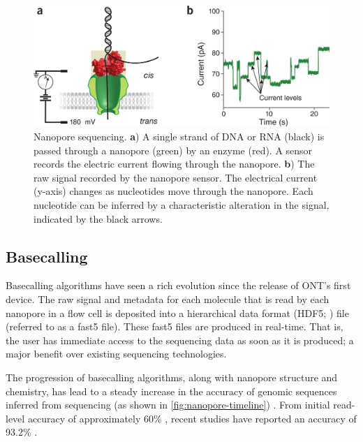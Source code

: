 \begin{figure}
\centering
\includegraphics[width=0.9\columnwidth]{Chapter0/Figs/nanopore.png}
\caption{Nanopore sequencing. \textbf{a}) A single strand of DNA or RNA (black) is passed through a nanopore (green) by an enzyme (red). A sensor records the electric current flowing through the nanopore. \textbf{b}) The raw signal recorded by the nanopore sensor. The electrical current (y-axis) changes as nucleotides move through the nanopore. Each nucleotide can be inferred by a characteristic alteration in the signal, indicated by the black arrows.}
\label{fig:nanopore}
\end{figure}

\subsection{Basecalling}

Basecalling algorithms have seen a rich evolution since the release of ONT's first device. The raw signal and metadata for each molecule that is read by each nanopore in a flow cell is deposited into a hierarchical data format (HDF5; \cite{hdf5}) file (referred to as a fast5 file). These fast5 files are produced in real-time. That is, the user has immediate access to the sequencing data as soon as it is produced; a major benefit over existing sequencing technologies.

The progression of basecalling algorithms, along with nanopore structure and chemistry, has lead to a steady increase in the accuracy of genomic sequences inferred from \ont{} sequencing (as shown in \autoref{fig:nanopore-timeline}) \cite{Rang2018}. From initial read-level accuracy of approximately 60\% \cite{Goodwin2015}, recent studies have reported an accuracy of 93.2\% \cite{Silvestre2021}.

